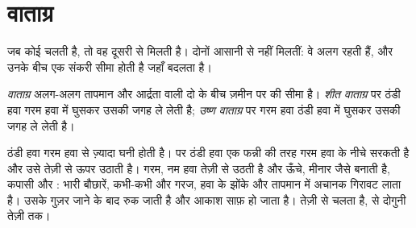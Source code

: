 \section{वाताग्र}

जब कोई  चलती है, तो वह दूसरी से मिलती है। दोनों आसानी से नहीं मिलतीं: वे अलग
रहती हैं, और उनके बीच एक संकरी सीमा होती है जहाँ  बदलता
है।

\begin{definition}[वाताग्र]\label{def:g8:fronts-and-weather-maps:front}
\emph{वाताग्र} अलग-अलग तापमान और आर्द्रता वाली दो  के बीच
ज़मीन पर की सीमा है। \emph{शीत वाताग्र} पर ठंडी हवा गरम हवा में
घुसकर उसकी जगह ले लेती है; \emph{उष्ण वाताग्र} पर गरम हवा
ठंडी हवा में घुसकर उसकी जगह ले लेती
है।
\end{definition}

ठंडी हवा गरम हवा से ज़्यादा घनी होती है।  पर ठंडी हवा एक फन्नी की तरह गरम
हवा के नीचे सरकती है और उसे तेज़ी से ऊपर उठाती है। गरम, नम हवा तेज़ी से उठती है और
ऊँचे, मीनार जैसे  बनाती है, कपासी और :  भारी बौछारें, कभी-कभी
 और गरज, हवा के झोंके और तापमान में अचानक गिरावट लाता है। उसके गुज़र जाने के बाद
 रुक जाती है और आकाश साफ़ हो जाता है।  तेज़ी से चलता है, 
से दोगुनी तेज़ी तक।

